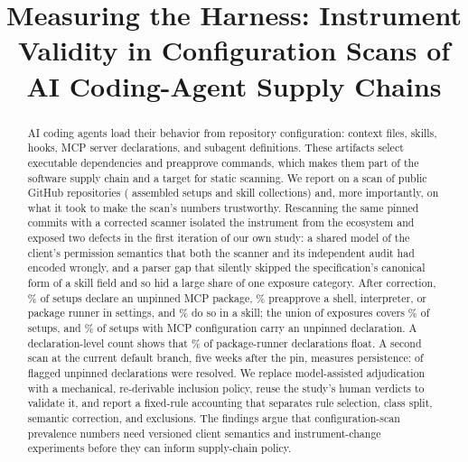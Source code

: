 \documentclass[10pt,conference]{IEEEtran}
\newcommand{\pct}[1]{#1\%}
\begin{document}
\title{Measuring the Harness: Instrument Validity in Configuration Scans of AI Coding-Agent Supply Chains}

\author{
}

\maketitle

\begin{abstract}
AI coding agents load their behavior from repository configuration: context files, skills, hooks, MCP server declarations, and subagent definitions. These artifacts select executable dependencies and preapprove commands, which makes them part of the software supply chain and a target for static scanning. We report on a scan of \NCorpus{} public GitHub repositories (\NSetups{} assembled setups and \NCollections{} skill collections) and, more importantly, on what it took to make the scan's numbers trustworthy. Rescanning the same pinned commits with a corrected scanner isolated the instrument from the ecosystem and exposed two defects in the first iteration of our own study: a shared model of the client's permission semantics that both the scanner and its independent audit had encoded wrongly, and a parser gap that silently skipped the specification's canonical form of a skill field and so hid a large share of one exposure category. After correction, \pct{\SOneSetupsPct} of setups declare an unpinned MCP package, \pct{\STwoSetupsPct} preapprove a shell, interpreter, or package runner in settings, and \pct{\SThreeSetupsPct} do so in a skill; the union of exposures covers \pct{\AnySSetupsPct} of setups, and \pct{\CondSOneofmcp} of setups with MCP configuration carry an unpinned declaration. A declaration-level count shows that \pct{\DeclPctUnpinnedOrTag} of package-runner declarations float. A second scan at the current default branch, five weeks after the pin, measures persistence: \PersSOneResolvedAtHead{} of \PersSOneFlaggedAtPin{} flagged unpinned declarations were resolved. We replace model-assisted adjudication with a mechanical, re-derivable inclusion policy, reuse the study's human verdicts to validate it, and report a fixed-rule accounting that separates rule selection, class split, semantic correction, and exclusions. The findings argue that configuration-scan prevalence numbers need versioned client semantics and instrument-change experiments before they can inform supply-chain policy.
\end{abstract}
\end{document}
